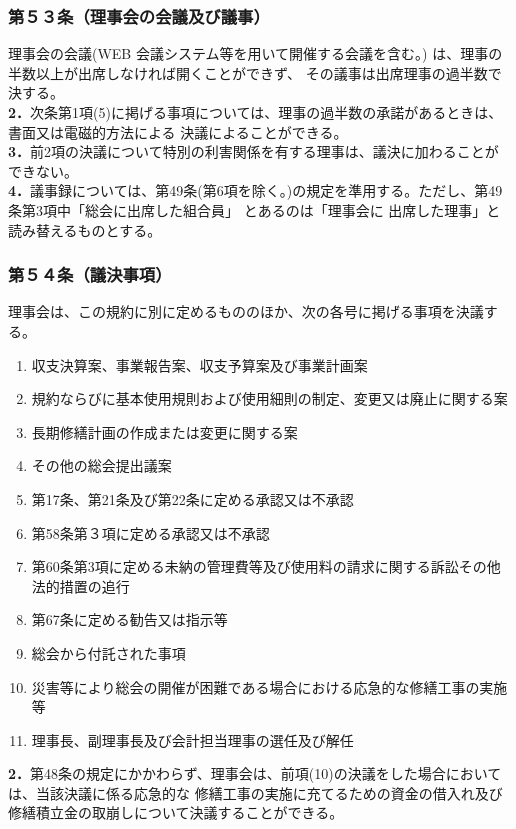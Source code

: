 \documentclass[
  luatex,
  paper=a4paper,
  fontsize=11pt,
  jafontsize=10pt,
  jlreq_notes,
]{jlreq}
\begin{document}
  \subsubsection*{第５３条（理事会の会議及び議事）}
  理事会の会議(WEB 会議システム等を用いて開催する会議を含む。) は、理事の半数以上が出席しなければ開くことができず、
  その議事は出席理事の過半数で決する。\\
  \textbf{2．}次条第1項(5)に掲げる事項については、理事の過半数の承諾があるときは、書面又は電磁的方法による
  決議によることができる。\\
  \textbf{3．}前2項の決議について特別の利害関係を有する理事は、議決に加わることができない。\\
  \textbf{4．}議事録については、第49条(第6項を除く。)の規定を準用する。ただし、第49条第3項中「総会に出席した組合員」
  とあるのは「理事会に 出席した理事」と読み替えるものとする。\\
  \subsubsection*{第５４条（議決事項）}
  理事会は、この規約に別に定めるもののほか、次の各号に掲げる事項を決議する。
  \begin{enumerate}
  \item 収支決算案、事業報告案、収支予算案及び事業計画案
  \item 規約ならびに基本使用規則および使用細則の制定、変更又は廃止に関する案
  \item 長期修繕計画の作成または変更に関する案
  \item その他の総会提出議案
  \item 第17条、第21条及び第22条に定める承認又は不承認
  \item 第58条第３項に定める承認又は不承認
  \item 第60条第3項に定める未納の管理費等及び使用料の請求に関する訴訟その他法的措置の追行
  \item 第67条に定める勧告又は指示等
  \item 総会から付託された事項
  \item 災害等により総会の開催が困難である場合における応急的な修繕工事の実施等
  \item 理事長、副理事長及び会計担当理事の選任及び解任
  \end{enumerate}
  \textbf{2．}第48条の規定にかかわらず、理事会は、前項(10)の決議をした場合においては、当該決議に係る応急的な
  修繕工事の実施に充てるための資金の借入れ及び修繕積立金の取崩しについて決議することができる。
\end{document}
